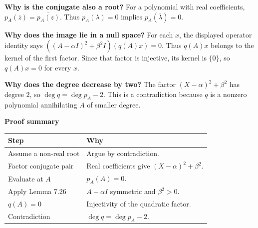 \documentclass[11pt,a4paper]{article}
\newcommand{\prooftable}[1]{\medskip\textbf{Proof summary}\par\smallskip #1\medskip}
\begin{document}
\begin{personalnote}
\textbf{Why is the conjugate also a root?}
For a polynomial with real coefficients,
\(p_A(\overline z)=\overline{p_A(z)}\). Thus \(p_A(\lambda)=0\) implies \(p_A(\overline\lambda)=0\).

\medskip

\textbf{Why does the image lie in a null space?}
For each \(x\), the displayed operator identity says
\(((A-\alpha I)^2+\beta^2I)(q(A)x)=0\).
Thus \(q(A)x\) belongs to the kernel of the first factor. Since that factor is injective, its kernel is \(\{0\}\), so \(q(A)x=0\) for every \(x\).

\medskip

\textbf{Why does the degree decrease by two?}
The factor \((X-\alpha)^2+\beta^2\) has degree \(2\), so \(\deg q=\deg p_A-2\).
This is a contradiction because \(q\) is a nonzero polynomial annihilating \(A\) of smaller degree.
\end{personalnote}
\prooftable{\begin{tabularx}{\linewidth}{@{}p{.29\linewidth}X@{}}\hline
Step & Why\\\hline
Assume a non-real root & Argue by contradiction.\\
Factor conjugate pair & Real coefficients give \((X-\alpha)^2+\beta^2\).\\
Evaluate at \(A\) & \(p_A(A)=0\).\\
Apply Lemma 7.26 & \(A-\alpha I\) symmetric and \(\beta^2>0\).\\
\(q(A)=0\) & Injectivity of the quadratic factor.\\
Contradiction & \(\deg q=\deg p_A-2\).\\\hline
\end{tabularx}}
\end{document}
